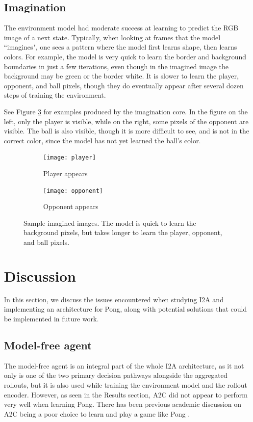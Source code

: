 \documentclass[10pt, twocolumn]{article}
\begin{document}
\subsection{Imagination}

The environment model had moderate success at learning to predict the RGB image of a next state. Typically, when looking at frames
that the model ``imagines", one sees a pattern where the model first learns shape, then learns colors. For example, the model is very quick to learn the border and background boundaries in just a few iterations, even though in the imagined image the background may be green or the border white. It is slower to learn the player, opponent, and ball pixels, though they do eventually appear after several dozen steps of training the environment.

See Figure \ref{imagination} for examples produced by the imagination core. In the figure on the left, only the player is visible, while on the right, some pixels of the opponent are visible. The ball is also visible, though it is more difficult to see, and is not in the correct color, since the model has not yet learned the ball's color.

\begin{figure}[h]
\centering
\begin{subfigure}[b]{.2\textwidth}
  \centering
  \texttt{[image: player]}
  \caption{Player appears}
  \label{fig:player}
\end{subfigure} 
\begin{subfigure}[b]{.2\textwidth}
  \centering
  \texttt{[image: opponent]}
  \caption{Opponent appears}
  \label{fig:opponent}
\end{subfigure} \hfill
\caption{Sample imagined images. The model is quick to learn the background pixels, but takes longer to learn the player, opponent, and ball pixels.}
\label{imagination}
\end{figure}

\section{Discussion}

In this section, we discuss the issues encountered when studying I2A and implementing an architecture for Pong, along with potential solutions that could be implemented in future work.

\subsection{Model-free agent}
The model-free agent is an integral part of the whole I2A architecture, as it not only is one of the two primary decision pathways alongside the aggregated rollouts, but it is also used while training the environment model and the rollout encoder. However, as seen
in the Results section, A2C did not appear to perform very well when learning Pong. There has been previous academic discussion on A2C being a poor choice to learn and play a game like Pong \cite{A2Cpong}.
\end{document}
